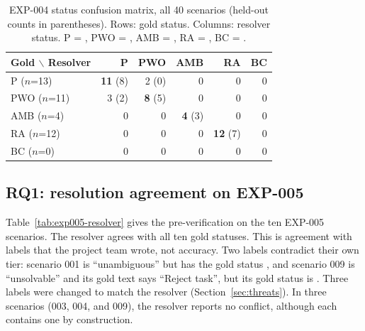 \begin{table}[t]
\caption{EXP-004 status confusion matrix, all 40 scenarios (held-out counts in parentheses). Rows: gold status. Columns: resolver status. P = \sP{}, PWO = \sPWO{}, AMB = \sAMB{}, RA = \sRA{}, BC = \sBC{}.}
\label{tab:exp004-confusion}
\footnotesize
\begin{tabular}{@{}lrrrrr@{}}
\toprule
Gold $\backslash$ Resolver & P & PWO & AMB & RA & BC \\
\midrule
P ($n$=13) & \textbf{11} (8) & 2 (0) & 0 & 0 & 0 \\
PWO ($n$=11) & 3 (2) & \textbf{8} (5) & 0 & 0 & 0 \\
AMB ($n$=4) & 0 & 0 & \textbf{4} (3) & 0 & 0 \\
RA ($n$=12) & 0 & 0 & 0 & \textbf{12} (7) & 0 \\
BC ($n$=0) & 0 & 0 & 0 & 0 & 0 \\
\bottomrule
\end{tabular}
\end{table}

\subsection{RQ1: resolution agreement on EXP-005}
Table~\ref{tab:exp005-resolver} gives the pre-verification on the ten EXP-005 scenarios. The resolver agrees with all ten gold statuses. This is agreement with labels that the project team wrote, not accuracy. Two labels contradict their own tier: scenario 001 is ``unambiguous'' but has the gold status \sAMB{}, and scenario 009 is ``unsolvable'' and its gold text says ``Reject task'', but its gold status is \sP{}. Three labels were changed to match the resolver (Section~\ref{sec:threats}). In three scenarios (003, 004, and 009), the resolver reports no conflict, although each contains one by construction.

